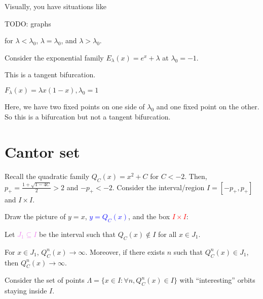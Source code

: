 \documentclass[class=pmath370,tikz,notes]{agony}
\begin{document}
Visually, you have situations like
\begin{center}
  TODO: graphs
\end{center}
for $\lambda<\lambda_0$, $\lambda = \lambda_0$, and $\lambda > \lambda_0$.

\begin{example}
  Consider the exponential family $E_\lambda(x) = e^x + \lambda$ at $\lambda_0=-1$.
\end{example}

This is a tangent bifurcation.

\begin{example}
  $F_\lambda(x) = \lambda x(1-x), \lambda_0 = 1$
\end{example}

Here, we have two fixed points on one side of $\lambda_0$
and one fixed point on the other.
So this is a bifurcation but not a tangent bifurcation.

\chapter{Cantor set}

Recall the quadratic family $Q_C(x) = x^2+C$ for $C < -2$.
Then, $p_+ = \frac{1+\sqrt{1-4C}}{2} > 2$ and $-p_+ < -2$.
Consider the interval/region $I = [-p_+,p_+]$ and $I\times I$.

Draw the picture of \textcolor{green!70!black}{$y=x$},
\textcolor{blue}{$y=Q_C(x)$}, and the box \textcolor{red}{$I \times I$}:
\begin{center}
\end{center}
Let \textcolor{violet}{$J_1 \subseteq I$} be the interval such that $Q_C(x) \not\in I$ for all $x \in J_1$.

For $x \in J_1$, $Q_C^n(x) \to \infty$.
Moreover, if there exists $n$ such that $Q_C^n(x) \in J_1$,
then $Q_C^n(x) \to \infty$.

Consider the set of points $\Lambda = \{x \in I : \forall n, Q_C^n(x) \in I\}$
with ``interesting'' orbits staying inside $I$.
\end{document}
